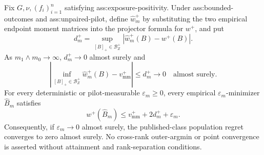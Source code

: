 Fix \(G,\nu,(f_i)_{i=1}^n\) satisfying ass:exposure-positivity.  Under ass:bounded-outcomes and ass:unpaired-pilot, define \(\widehat w_m^+\) by substituting the two empirical endpoint moment matrices into the projector formula for \(w^+\), and put
\[
d_m^+=\sup_{[B]_+\in\mathcal B_Z^+}|\widehat w_m^+(B)-w^+(B)|.
\]
As \(m_1\wedge m_0\to\infty\), \(d_m^+\to0\) almost surely and
\[
\left|\inf_{[B]_+\in\mathcal B_Z^+}\widehat w_m^+(B)-v_{\mathrm{mm}}^+\right|
\le d_m^+\longrightarrow0
\quad\text{almost surely}.
\]
For every deterministic or pilot-measurable \(\varepsilon_m\ge0\), every empirical \(\varepsilon_m\)-minimizer \(\widehat B_m\) satisfies
\[
w^+(\widehat B_m)
\le v_{\mathrm{mm}}^++2d_m^++\varepsilon_m.
\]
Consequently, if \(\varepsilon_m\to0\) almost surely, the published-class population regret converges to zero almost surely.  No cross-rank outer-argmin or point convergence is asserted without attainment and rank-separation conditions.